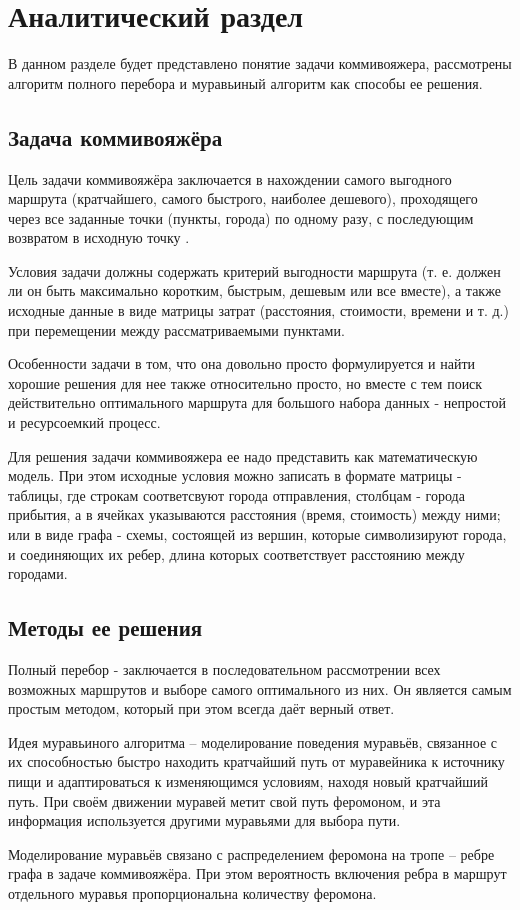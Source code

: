 \chapter{Аналитический раздел}
\label{cha:analysis}
В данном разделе будет представлено понятие задачи коммивояжера, рассмотрены алгоритм полного перебора и муравьиный алгоритм как способы ее решения.

\section{Задача коммивояжёра}
Цель задачи коммивояжёра заключается в нахождении самого выгодного маршрута (кратчайшего, самого быстрого, наиболее дешевого), проходящего через все заданные точки (пункты, города) по одному разу, с последующим возвратом в исходную точку \cite{salesman}.
\par Условия задачи должны содержать критерий выгодности маршрута (т. е. должен ли он быть максимально коротким, быстрым, дешевым или все вместе), а также исходные данные в виде матрицы затрат (расстояния, стоимости, времени и т. д.) при перемещении между рассматриваемыми пунктами. 
\par Особенности задачи в том, что она довольно просто формулируется и найти хорошие решения для нее также относительно просто, но вместе с тем поиск действительно оптимального маршрута для большого набора данных - непростой и ресурсоемкий процесс. 
\par Для решения задачи коммивояжера ее надо представить как математическую модель. При этом исходные условия можно записать в формате матрицы - таблицы, где строкам соответсвуют города отправления, столбцам - города прибытия, а в ячейках указываются расстояния (время, стоимость) между ними; или в виде графа - схемы, состоящей из вершин, которые символизируют города, и соединяющих их ребер, длина которых соответствует расстоянию между городами.

\section{Методы ее решения}
Полный перебор - заключается в последовательном рассмотрении всех возможных маршрутов и выборе самого оптимального из них. Он является самым простым методом, который при этом всегда даёт верный ответ.
\par Идея муравьиного алгоритма -- моделирование поведения муравьёв, связанное с их способностью быстро находить кратчайший путь от муравейника к источнику пищи и адаптироваться к изменяющимся условиям, находя новый кратчайший путь. При своём движении муравей метит свой путь феромоном, и эта информация используется другими муравьями для выбора пути\cite{ulyanov}. 
\par Моделирование муравьёв связано с распределением феромона на тропе -- ребре графа в задаче коммивояжёра. При этом вероятность включения ребра в маршрут отдельного муравья пропорциональна количеству феромона.

